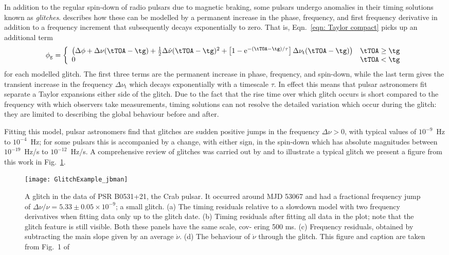 In addition to the regular spin-down of radio pulsars due to magnetic braking, some
pulsars undergo anomalies in their timing solutions known as \emph{glitches}.
\citet{Edwards2006} describes how these can be modelled by a permanent increase
in the phase, frequency, and first frequency derivative in addition to a
frequency increment that subsequently decays exponentially to zero. That is,
Eqn.~\eqref{eqn: Taylor compact} picks up an additional term
\begin{align}
\phi_{\textrm{g}} = \left\{
\begin{array}{ll}
\left( \Delta\phi + \Delta\nu(\tTOA - \tg) + \frac{1}{2}\Delta\dot{\nu}(\tTOA - \tg)^{2}
+ \left[1-\textrm{e}^{-(\tTOA - \tg)/\tau}\right]\Delta\nu_{\textrm{t}}(\tTOA - \tg)\right)
& \tTOA \ge \tg \\
0 & \tTOA < \tg
\end{array}
\right.
\label{eqn: glitch timing model}
\end{align}
for each modelled glitch. The first three terms are the permanent increase
in phase, frequency, and spin-down, while the last term gives the transient
increase in the frequency $\Delta\nu_{\textrm{t}}$ which decays exponentially
with a timescale $\tau$. In effect this means that pulsar astronomers fit
separate a Taylor expansions either side of the glitch. Due to the fact that
the rise time over which glitch occurs is short compared to the frequency
with which observers take measurements, timing solutions can not resolve the
detailed variation which occur during the glitch: they are limited to describing
the global behaviour before and after.

Fitting this model, pulsar astronomers find that glitches are sudden positive
jumps in the frequency $\Delta\nu > 0$, with typical values of $10^{-9}$~Hz to
$10^{-4}$~Hz; for some pulsars this is accompanied by a change, with either
sign, in the spin-down which has absolute magnitudes between $10^{-19}$~Hz/s to
$10^{-12}$~Hz/s. A comprehensive review of glitches was carried out by
\citet{Espinoza2011} and to illustrate a typical glitch we present a figure
from this work in Fig.~\ref{fig: glitch}.
\begin{figure}[htb]
    \centering
    \texttt{[image: GlitchExample\_jbman]}
    \caption{
A glitch in the data of PSR B0531+21, the Crab pulsar. It occurred around MJD
53067 and had a fractional frequency jump of $\Delta\nu/\nu = 5.33 \pm 0.05
\times 10^{−9}$; a small glitch. (a) The timing residuals relative to a
slowdown model with two frequency derivatives when fitting data only up to the
glitch date. (b) Timing residuals after fitting all data in the plot; note
that the glitch feature is still visible. Both these panels have the same
scale, cov- ering 500 ms. (c) Frequency residuals, obtained by subtracting the
main slope given by an average $\dot\nu$.  (d) The behaviour of $\dot\nu$
through the glitch. This figure and caption are taken from Fig.~1 of
\citet{Espinoza2011}}
    \label{fig: glitch}
\end{figure}

